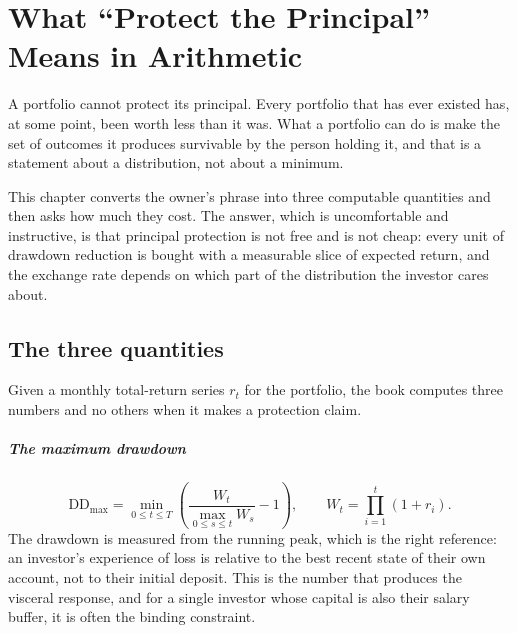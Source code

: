 
\chapter{What ``Protect the Principal'' Means in Arithmetic}
\label{ch:principal}

A portfolio cannot protect its principal. Every portfolio that has ever
existed has, at some point, been worth less than it was. What a portfolio
can do is make the set of outcomes it produces survivable by the person
holding it, and that is a statement about a distribution, not about a
minimum.

This chapter converts the owner's phrase into three computable quantities and
then asks how much they cost. The answer, which is uncomfortable and
instructive, is that principal protection is not free and is not cheap: every
unit of drawdown reduction is bought with a measurable slice of expected
return, and the exchange rate depends on which part of the distribution the
investor cares about.

\section{The three quantities}

Given a monthly total-return series \(r_t\) for the portfolio, the book
computes three numbers and no others when it makes a protection claim.

\paragraph{The maximum drawdown}
\begin{equation}
\mathrm{DD}_{\max} = \min_{0 \le t \le T}
\left( \frac{W_t}{\max_{0 \le s \le t} W_s} - 1 \right),
\qquad
W_t = \prod_{i=1}^{t}(1+r_i).
\end{equation}
The drawdown is measured from the running peak, which is the right
reference: an investor's experience of loss is relative to the best recent
state of their own account, not to their initial deposit. This is the
number that produces the visceral response, and for a single investor whose
capital is also their salary buffer, it is often the binding constraint.

